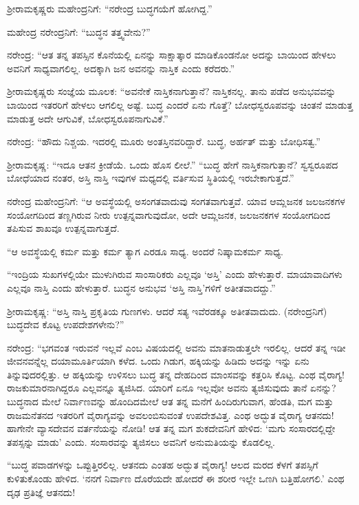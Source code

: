 ಶ‍್ರೀರಾಮಕೃಷ್ಣರು ಮಹೇಂದ್ರನಿಗೆ: “ನರೇಂದ್ರ ಬುದ್ಧಗಯೆಗೆ ಹೋಗಿದ್ದ.”

ಮಹೇಂದ್ರ ನರೇಂದ್ರನಿಗೆ: “ಬುದ್ಧನ ತತ್ತ್ವವೇನು?”

ನರೇಂದ್ರ: “ಆತ ತನ್ನ ತಪಸ್ಸಿನ ಕೊನೆಯಲ್ಲಿ ಏನನ್ನು ಸಾಕ್ಷಾತ್ಕಾರ ಮಾಡಿಕೊಂಡನೋ ಅದನ್ನು ಬಾಯಿಂದ ಹೇಳಲು ಅವನಿಗೆ ಸಾಧ್ಯವಾಗಲಿಲ್ಲ. ಅದಕ್ಕಾಗಿ ಜನ ಅವನನ್ನು ನಾಸ್ತಿಕ ಎಂದು ಕರೆದರು.”

ಶ‍್ರೀರಾಮಕೃಷ್ಣರು ಸಂಜ್ಞೆಯ ಮೂಲಕ: “ಅವನೇಕೆ ನಾಸ್ತಿಕನಾಗುತ್ತಾನೆ? ನಾಸ್ತಿಕನಲ್ಲ. ತಾನು ಪಡೆದ ಅನುಭವವನ್ನು ಬಾಯಿಂದ ಇತರರಿಗೆ ಹೇಳಲು ಆಗಲಿಲ್ಲ ಅಷ್ಟೆ. ಬುದ್ಧ ಎಂದರೆ ಏನು ಗೊತ್ತೆ? ಬೋಧಸ್ವರೂಪವನ್ನು ಚಿಂತನೆ ಮಾಡುತ್ತ ಮಾಡುತ್ತ ಅದೇ ಆಗುವಿಕೆ, ಬೋಧಸ್ವರೂಪನಾಗುವಿಕೆ.”

ನರೇಂದ್ರ: “ಹೌದು ನಿಶ್ಚಯ. ಇದರಲ್ಲಿ ಮೂರು ಅಂತಸ್ತಿನವರಿದ್ದಾರೆ. ಬುದ್ಧ, ಅರ್ಹತ್ ಮತ್ತು ಬೋಧಿಸತ್ವ.”

ಶ‍್ರೀರಾಮಕೃಷ್ಣ: “ಇದೂ ಆತನ ಕ್ರೀಡೆಯೆ. ಒಂದು ಹೊಸ ಲೀಲೆ.” “ಬುದ್ಧ ಹೇಗೆ ನಾಸ್ತಿಕನಾಗುತ್ತಾನೆ? ಸ್ವಸ್ವರೂಪದ ಬೋಧೆಯಾದ ನಂತರ, ಅಸ್ತಿ ನಾಸ್ತಿ ಇವುಗಳ ಮಧ್ಯದಲ್ಲಿ ವರ್ತಿಸುವ ಸ್ಥಿತಿಯಲ್ಲಿ ಇರಬೇಕಾಗುತ್ತದೆ.”

ನರೇಂದ್ರ ಮಹೇಂದ್ರನಿಗೆ: “ಆ ಅವಸ್ಥೆಯಲ್ಲಿ ಅಸಂಗತವಾದುವು ಸಂಗತವಾಗುತ್ತವೆ. ಯಾವ ಆಮ್ಲಜನಕ ಜಲಜನಕಗಳ ಸಂಯೋಗದಿಂದ ತಣ್ಣಗಿರುವ ನೀರು ಉತ್ಪನ್ನವಾಗುವುದೋ, ಅದೇ ಆಮ್ಲಜನಕ, ಜಲಜನಕಗಳ ಸಂಯೋಗದಿಂದ ತಪಿಸುವ ಶಾಖವೂ ಉತ್ಪನ್ನವಾಗುತ್ತದೆ.

“ಆ ಅವಸ್ಥೆಯಲ್ಲಿ ಕರ್ಮ ಮತ್ತು ಕರ್ಮ ತ್ಯಾಗ ಎರಡೂ ಸಾಧ್ಯ. ಅಂದರೆ ನಿಷ್ಕಾಮಕರ್ಮ ಸಾಧ್ಯ.

“ಇಂದ್ರಿಯ ಸುಖಗಳಲ್ಲಿಯೇ ಮುಳುಗಿರುವ ಸಾಂಸಾರಿಕರು ಎಲ್ಲವೂ ‘ಅಸ್ತಿ’ ಎಂದು ಹೇಳುತ್ತಾರೆ. ಮಾಯಾವಾದಿಗಳು ಎಲ್ಲವೂ ನಾಸ್ತಿ ಎಂದು ಹೇಳುತ್ತಾರೆ. ಬುದ್ಧನ ಅನುಭವ ‘ಅಸ್ತಿ ನಾಸ್ತಿ’ಗಳಿಗೆ ಅತೀತವಾದದ್ದು.”

ಶ‍್ರೀರಾಮಕೃಷ್ಣ: “ಅಸ್ತಿ ನಾಸ್ತಿ ಪ್ರಕೃತಿಯ ಗುಣಗಳು. ಆದರೆ ಸತ್ಯ ಇವೆರಡಕ್ಕೂ ಅತೀತವಾದುದು. (ನರೇಂದ್ರನಿಗೆ) ಬುದ್ಧದೇವ ಕೊಟ್ಟ ಉಪದೇಶಗಳೇನು?”

ನರೇಂದ್ರ: “ಭಗವಂತ ಇರುವನೆ ಇಲ್ಲವೆ ಎಂಬ ವಿಷಯದಲ್ಲಿ ಅವನು ಮಾತನಾಡುತ್ತಲೇ ಇರಲಿಲ್ಲ. ಆದರೆ ತನ್ನ ಇಡೀ ಜೀವನವನ್ನೆಲ್ಲ ದಯಾಮೂರ್ತಿಯಾಗಿ ಕಳೆದ. ಒಂದು ಗಿಡುಗ, ಹಕ್ಕಿಯನ್ನು ಹಿಡಿದು ಅದನ್ನು ಇನ್ನು ಏನು ತಿನ್ನುವುದರಲ್ಲಿತ್ತು. ಆ ಹಕ್ಕಿಯನ್ನು ಉಳಿಸಲು ಬುದ್ಧ ತನ್ನ ದೇಹದಿಂದ ಮಾಂಸವನ್ನು ಕತ್ತರಿಸಿ ಕೊಟ್ಟ. ಎಂಥ ವೈರಾಗ್ಯ! ರಾಜಕುಮಾರನಾಗಿದ್ದರೂ ಎಲ್ಲವನ್ನೂ ತ್ಯಜಿಸಿದ. ಯಾರಿಗೆ ಏನೂ ಇಲ್ಲವೋ ಅವನು ತ್ಯಜಿಸುವುದು ತಾನೆ ಏನನ್ನು? ಬುದ್ಧನಾದ ಮೇಲೆ ನಿರ್ವಾಣವನ್ನು ಹೊಂದಿದಮೇಲೆ ಆತ ತನ್ನ ಮನೆಗೆ ಹಿಂದಿರುಗುವಾಗ, ಹೆಂಡತಿ, ಮಗ ಮತ್ತು ರಾಜಮನೆತನದ ಇತರರಿಗೆ ವೈರಾಗ್ಯವನ್ನು ಅವಲಂಬಿಸುವಂತೆ ಉಪದೇಶವಿತ್ತ. ಎಂಥ ಅದ್ಭುತ ವೈರಾಗ್ಯ ಆತನದು! ಹಾಗೇನೇ ವ್ಯಾಸದೇವನ ವರ್ತನೆಯನ್ನು ನೋಡಿ! ಆತ ತನ್ನ ಮಗ ಶುಕದೇವನಿಗೆ ಹೇಳಿದ: ‘ಮಗು ಸಂಸಾರದಲ್ಲಿದ್ದೇ ತಪಸ್ಸನ್ನು ಮಾಡು’ ಎಂದು. ಸಂಸಾರವನ್ನು ತ್ಯಜಿಸಲು ಅವನಿಗೆ ಅನುಮತಿಯನ್ನು ಕೊಡಲಿಲ್ಲ.

\newpage

“ಬುದ್ಧ ಪವಾಡಗಳನ್ನು ಒಪ್ಪುತ್ತಿರಲಿಲ್ಲ. ಆತನದು ಎಂತಹ ಅದ್ಭುತ ವೈರಾಗ್ಯ! ಆಲದ ಮರದ ಕೆಳಗೆ ತಪಸ್ಸಿಗೆ ಕುಳಿತುಕೊಂಡು ಹೇಳಿದ. ‘ನನಗೆ ನಿರ್ವಾಣ ದೊರೆಯದೇ ಹೋದರೆ ಈ ಶರೀರ ಇಲ್ಲೇ ಒಣಗಿ ಬತ್ತಿಹೋಗಲಿ.’ ಎಂಥ ದೃಢ ಪ್ರತಿಜ್ಞೆ ಆತನದು!

